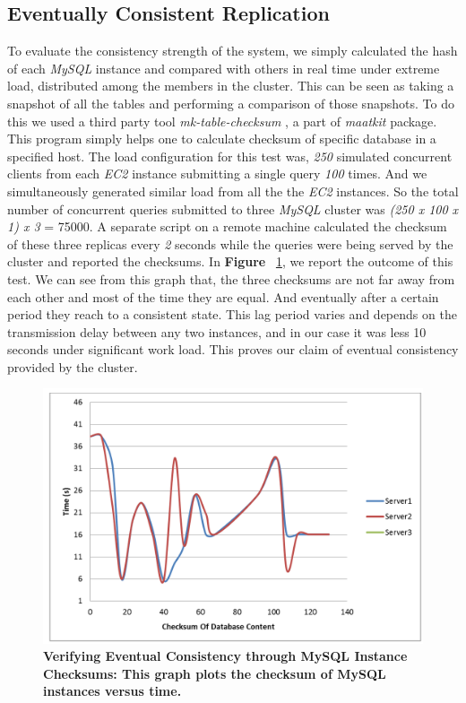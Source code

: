 \documentclass[12pt]{article}
\begin{document}
\subsection{Eventually Consistent Replication} To evaluate the
consistency strength of the system, we simply calculated the hash of each
\emph{MySQL} instance and compared with others in real time under extreme
load, distributed among the members in the cluster. This can be seen as taking a
snapshot of all the tables and performing a comparison of those snapshots. To do
this we used a third party tool \emph{mk-table-checksum} \cite{mk-table}, a part
of \emph{maatkit} \cite{maatkit} package. This program simply helps one to
calculate checksum of specific database in a specified host. The load
configuration for this test was, \emph{250} simulated concurrent clients from
each \emph{EC2} instance submitting a single query \emph{100} times. And we
simultaneously generated similar load from all the the \emph{EC2} instances. So
the total number of concurrent queries submitted to three \emph{MySQL} cluster
was \emph{(250 x 100 x 1) x 3} = 75000. A separate script on a remote machine
calculated the checksum of these three replicas every \emph{2} seconds while the
queries were being served by the cluster and reported the checksums. In
\textbf{Figure }~\ref{fig:consistency}, we report the outcome of this test. We
can see from this graph that, the three checksums are not far away from each
other and most of the time they are equal. And eventually after a certain period
they reach to a consistent state. This lag period varies and depends on the
transmission delay between any two instances, and in our case it was less 10
seconds under significant work load. This proves our claim of eventual
consistency provided by the cluster.  

\begin{figure}[H] 
\centering
\includegraphics[scale=0.35]{Images/graph_consistency.PNG}
\caption{\textbf{Verifying Eventual Consistency through MySQL Instance Checksums: This 
graph plots the checksum of MySQL instances versus time.}
}
\label{fig:consistency} 
\end{figure} 
\end{document}
